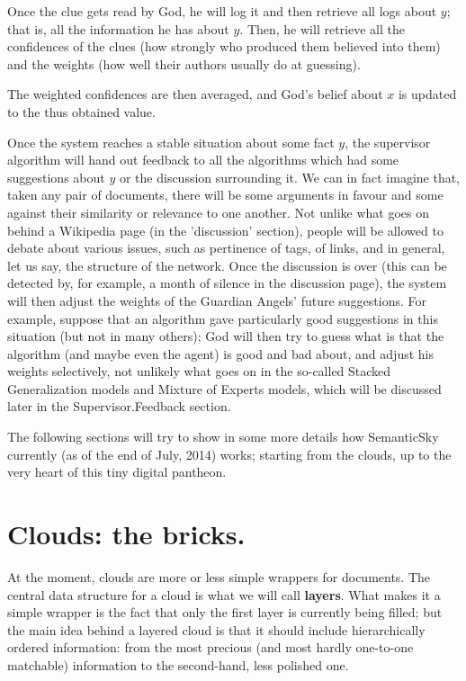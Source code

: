 \documentclass[11pt]{article}
\begin{document}
Once the clue gets read by God, he will log it and then retrieve all logs about $y$; that is, all the information he has about $y$. Then, he will retrieve all the confidences of the clues (how strongly who produced them believed into them) and the weights (how well their authors usually do at guessing).

The weighted confidences are then averaged, and God's belief about $x$ is updated to the thus obtained value.

Once the system reaches a stable situation about some fact $y$, the supervisor algorithm will hand out feedback to all the algorithms which had some suggestions about $y$ or the discussion surrounding it. We can in fact imagine that, taken any pair of documents, there will be some arguments in favour and some against their similarity or relevance to one another. Not unlike what goes on behind a Wikipedia page (in the 'discussion' section), people will be allowed to debate about various issues, such as pertinence of tags, of links, and in general, let us say, the structure of the network. 
Once the discussion is over (this can be detected by, for example, a month of silence in the discussion page), the system will then adjust the weights of the Guardian Angels' future suggestions. For example, suppose that an algorithm gave particularly good suggestions in this situation (but not in many others); God will then try to guess what is that the algorithm (and maybe even the agent) is good and bad about, and adjust his weights selectively, not unlikely what goes on in the so-called Stacked Generalization models and Mixture of Experts models, which will be discussed later in the Supervisor.Feedback section.

The following sections will try to show in some more details how SemanticSky currently (as of the end of July, 2014) works; starting from the clouds, up to the very heart of this tiny digital pantheon.

\section{Clouds: the bricks.}

At the moment, clouds are more or less simple wrappers for documents. The central data structure for a cloud is what we will call \textbf{layers}. What makes it a simple wrapper is the fact that only the first layer is currently being filled; but the main idea behind a layered cloud is that it should include hierarchically ordered information: from the most precious (and most hardly one-to-one matchable) information to the second-hand, less polished one.
\end{document}

